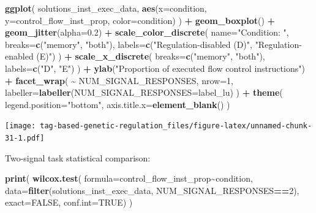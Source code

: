 \documentclass[
]{book}
\newenvironment{Shaded}{\begin{snugshade}}{\end{snugshade}}
\newcommand{\DataTypeTok}[1]{\textcolor[rgb]{0.13,0.29,0.53}{#1}}
\newcommand{\DecValTok}[1]{\textcolor[rgb]{0.00,0.00,0.81}{#1}}
\newcommand{\FloatTok}[1]{\textcolor[rgb]{0.00,0.00,0.81}{#1}}
\newcommand{\KeywordTok}[1]{\textcolor[rgb]{0.13,0.29,0.53}{\textbf{#1}}}
\newcommand{\NormalTok}[1]{#1}
\newcommand{\OperatorTok}[1]{\textcolor[rgb]{0.81,0.36,0.00}{\textbf{#1}}}
\newcommand{\OtherTok}[1]{\textcolor[rgb]{0.56,0.35,0.01}{#1}}
\newcommand{\StringTok}[1]{\textcolor[rgb]{0.31,0.60,0.02}{#1}}
\begin{document}
\begin{Shaded}
\begin{Highlighting}[]
\KeywordTok{ggplot}\NormalTok{( solutions\_inst\_exec\_data, }\KeywordTok{aes}\NormalTok{(}\DataTypeTok{x=}\NormalTok{condition, }\DataTypeTok{y=}\NormalTok{control\_flow\_inst\_prop, }\DataTypeTok{color=}\NormalTok{condition) ) }\OperatorTok{+}
\StringTok{  }\KeywordTok{geom\_boxplot}\NormalTok{() }\OperatorTok{+}
\StringTok{  }\KeywordTok{geom\_jitter}\NormalTok{(}\DataTypeTok{alpha=}\FloatTok{0.2}\NormalTok{) }\OperatorTok{+}
\StringTok{  }\KeywordTok{scale\_color\_discrete}\NormalTok{(}
    \DataTypeTok{name=}\StringTok{"Condition: "}\NormalTok{,}
    \DataTypeTok{breaks=}\KeywordTok{c}\NormalTok{(}\StringTok{"memory"}\NormalTok{, }\StringTok{"both"}\NormalTok{),}
    \DataTypeTok{labels=}\KeywordTok{c}\NormalTok{(}\StringTok{"Regulation{-}disabled (D)"}\NormalTok{, }\StringTok{"Regulation{-}enabled (E)"}\NormalTok{)}
\NormalTok{  ) }\OperatorTok{+}
\StringTok{  }\KeywordTok{scale\_x\_discrete}\NormalTok{(}
    \DataTypeTok{breaks=}\KeywordTok{c}\NormalTok{(}\StringTok{"memory"}\NormalTok{, }\StringTok{"both"}\NormalTok{),}
    \DataTypeTok{labels=}\KeywordTok{c}\NormalTok{(}\StringTok{"D"}\NormalTok{, }\StringTok{"E"}\NormalTok{)}
\NormalTok{  ) }\OperatorTok{+}
\StringTok{  }\KeywordTok{ylab}\NormalTok{(}\StringTok{"Proportion of executed flow control instructions"}\NormalTok{) }\OperatorTok{+}
\StringTok{  }\KeywordTok{facet\_wrap}\NormalTok{(}
    \OperatorTok{\textasciitilde{}}\StringTok{ }\NormalTok{NUM\_SIGNAL\_RESPONSES,}
    \DataTypeTok{nrow=}\DecValTok{1}\NormalTok{,}
    \DataTypeTok{labeller=}\KeywordTok{labeller}\NormalTok{(}\DataTypeTok{NUM\_SIGNAL\_RESPONSES=}\NormalTok{label\_lu)}
\NormalTok{  ) }\OperatorTok{+}
\StringTok{  }\KeywordTok{theme}\NormalTok{(}
    \DataTypeTok{legend.position=}\StringTok{"bottom"}\NormalTok{,}
    \DataTypeTok{axis.title.x=}\KeywordTok{element\_blank}\NormalTok{()}
\NormalTok{  )}
\end{Highlighting}
\end{Shaded}

\texttt{[image: tag-based-genetic-regulation\_files/figure-latex/unnamed-chunk-31-1.pdf]}

Two-signal task statistical comparison:

\begin{Shaded}
\begin{Highlighting}[]
\KeywordTok{print}\NormalTok{(}
  \KeywordTok{wilcox.test}\NormalTok{(}
    \DataTypeTok{formula=}\NormalTok{control\_flow\_inst\_prop}\OperatorTok{\textasciitilde{}}\NormalTok{condition,}
    \DataTypeTok{data=}\KeywordTok{filter}\NormalTok{(solutions\_inst\_exec\_data, NUM\_SIGNAL\_RESPONSES}\OperatorTok{==}\DecValTok{2}\NormalTok{),}
    \DataTypeTok{exact=}\OtherTok{FALSE}\NormalTok{,}
    \DataTypeTok{conf.int=}\OtherTok{TRUE}\NormalTok{)}
\NormalTok{)}
\end{Highlighting}
\end{Shaded}
\end{document}
